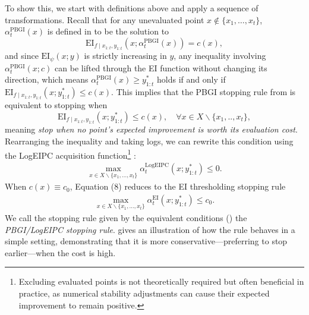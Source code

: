To show this, we start with definitions above and apply a sequence of transformations.
Recall that for any unevaluated point $x \notin \{x_1, \dots, x_t\}$, $\alpha_t^{\mathrm{PBGI}}(x)$ is defined in  to be the solution to
\begin{equation}
\mathrm{EI}_{f \mid x_{1:t}, y_{1:t}}(x; \alpha_t^{\mathrm{PBGI}}(x)) = c(x),    
\end{equation}
and since $\mathrm{EI}_{\psi}(x; y)$ is strictly increasing in $y$, any inequality involving $\alpha_t^{\mathrm{PBGI}}(x; c)$ can be lifted through the EI function without changing its direction, which means 
$\alpha_t^{\mathrm{PBGI}}(x) \geq y^*_{1:t}$ holds if and only if
$\mathrm{EI}_{f \mid x_{1:t}, y_{1:t}}\left(x; y^*_{1:t}\right) \leq c(x)$. 
This implies that the PBGI stopping rule from  is equivalent to stopping when
\begin{equation}
    \label{eqn:EI_c_stopping}
\mathrm{EI}_{f \mid x_{1:t}, y_{1:t}}\left(x; y^*_{1:t}\right) \leq c(x),
\quad
\forall x \in X \backslash \{x_1, .., x_t\},
\end{equation}
meaning \emph{stop when no point's expected improvement is worth its evaluation cost}.
Rearranging the inequality and taking logs, we can rewrite this condition using the LogEIPC acquisition function\footnote{Excluding evaluated points is not theoretically required but often beneficial in practice, as numerical stability adjustments can cause their expected improvement to remain positive.}
:
\begin{align}
    \label{eqn:LogEIPC_stopping}
    \max_{x\in X\backslash \{x_1, \dots, x_t\}} \alpha_t^{\mathrm{LogEIPC}}(x; y^*_{1:t}) \leq 0
    .
\end{align}
When \(c(x)\equiv c_0\), Equation (8) reduces to the EI thresholding stopping rule \cite{nguyen2017regret,zhou2024corrected} 
\begin{align}
    \label{eqn:EI_stopping}
    \max_{x\in X\backslash \{x_1, \dots, x_t\}} \alpha_t^{\mathrm{EI}}(x; y^*_{1:t}) \leq c_0
    .
\end{align}
We call the stopping rule given by the equivalent conditions () the \emph{PBGI/LogEIPC stopping rule}.
 gives an illustration of how the rule behaves in a simple setting, demonstrating that it is more conservative---preferring to stop earlier---when the cost is high.
